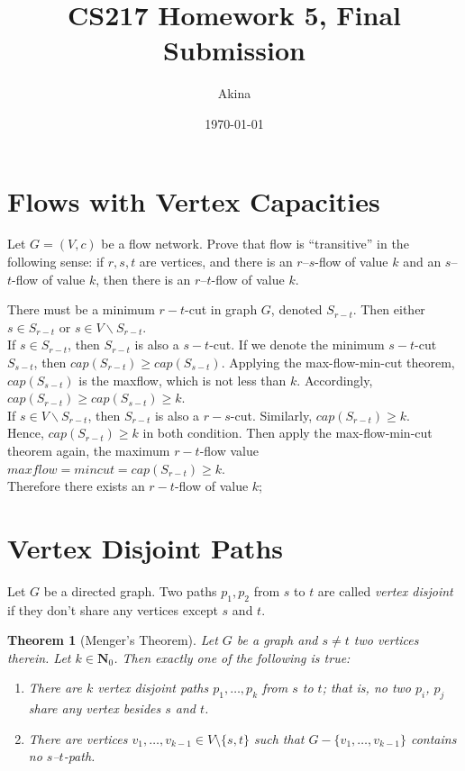 \documentclass[11pt,a4paper,oneside]{article}
\newtheorem{theorem}{Theorem}
\renewcommand{\hwtitle} {CS217 Homework 5, Final Submission}
\renewcommand{\hwauthor}{Akina}
\renewcommand{\hwdate}{\today}
\begin{document}
\title{\hwtitle}
\author{\hwauthor}
\date{\hwdate}
\maketitle



\setcounter{section}{4}
\section*{Flows with Vertex Capacities}


\begin{problem}{1}
	\statement
    Let $G = (V,c)$ be a flow network. Prove that flow is ``transitive'' in the following sense: if $r,s,t$ are vertices, 
    and there is an $r$--$s$-flow of value $k$ and an $s$--$t$-flow of value $k$, then there is an $r$--$t$-flow of 
    value $k$.
    
    \solution
    There must be a minimum $r-t$-cut in graph $G$, denoted $S_{r-t}$. Then  either $s \in S_{r-t}$ or $s \in V \backslash S_{r-t} $.\\
    If $s \in S_{r-t}$, then $S_{r-t}$ is also a $s - t$-cut. If we denote the minimum $s-t$-cut $S_{s-t}$, then $cap(S_{r-t}) \ge cap(S_{s-t})$. Applying the max-flow-min-cut theorem, $cap(S_{s-t})$ is the maxflow, which is not less than $k$. Accordingly, $cap(S_{r-t}) \ge cap(S_{s-t}) \ge k$.\\
    If $s \in V \backslash S_{r-t}$, then $S_{r-t}$ is also a $r - s$-cut. Similarly, $cap(S_{r-t}) \ge k$.\\
    Hence, $cap(S_{r-t}) \ge k$ in both condition. Then apply the max-flow-min-cut theorem again, the maximum $r - t$-flow value $maxflow = mincut = cap(S_{r - t}) \ge k$.\\
    Therefore there exists an $r-t$-flow of value $k$;
\end{problem}

\section*{Vertex Disjoint Paths}

Let $G$ be a directed graph. Two paths $p_1, p_2$ from $s$ to $t$ are called {\em vertex disjoint}
if they don't share any vertices except $s$ and $t$. 

\begin{theorem}[Menger's Theorem]
   Let $G$ be a graph and $s \ne t$ two vertices therein. Let $k \in \mathbf{N}_0$. 
   Then exactly one of the following is true:
   \begin{enumerate}
   \item There are $k$ vertex disjoint paths $p_1,\dots,p_k$ from $s$ to $t$; that is, no two $p_i$, $p_j$ share
   any vertex besides $s$ and $t$.
   \item There are vertices $v_1,\dots,v_{k-1} \in V \setminus \{s,t\}$ such that
   $G - \{v_1,\dots, v_{k-1}\}$ contains no $s$--$t$-path.
   \end{enumerate}
\end{theorem}
\end{document}
